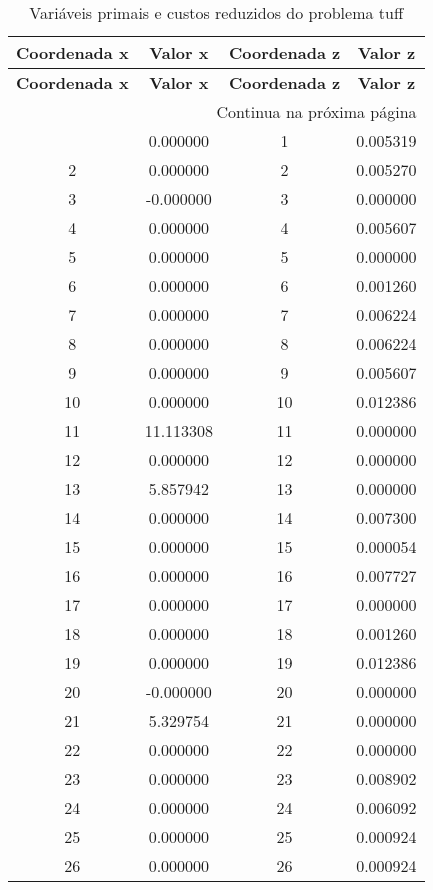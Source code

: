 \documentclass[12pt]{article}
\begin{document}
\begin{longtable}{@{}cccc@{}}
\caption{Variáveis primais e custos reduzidos do problema tuff} \\
\toprule
\textbf{Coordenada x} & \textbf{Valor x} & \textbf{Coordenada z} & \textbf{Valor z} \\
\midrule
\endfirsthead

\toprule
\textbf{Coordenada x} & \textbf{Valor x} & \textbf{Coordenada z} & \textbf{Valor z} \\
\midrule
\endhead

\midrule \multicolumn{4}{r}{{Continua na próxima página}} \\ \midrule
\endfoot

\bottomrule
\endlastfoot
1 & 0.000000 & 1 & 0.005319 \\
2 & 0.000000 & 2 & 0.005270 \\
3 & -0.000000 & 3 & 0.000000 \\
4 & 0.000000 & 4 & 0.005607 \\
5 & 0.000000 & 5 & 0.000000 \\
6 & 0.000000 & 6 & 0.001260 \\
7 & 0.000000 & 7 & 0.006224 \\
8 & 0.000000 & 8 & 0.006224 \\
9 & 0.000000 & 9 & 0.005607 \\
10 & 0.000000 & 10 & 0.012386 \\
11 & 11.113308 & 11 & 0.000000 \\
12 & 0.000000 & 12 & 0.000000 \\
13 & 5.857942 & 13 & 0.000000 \\
14 & 0.000000 & 14 & 0.007300 \\
15 & 0.000000 & 15 & 0.000054 \\
16 & 0.000000 & 16 & 0.007727 \\
17 & 0.000000 & 17 & 0.000000 \\
18 & 0.000000 & 18 & 0.001260 \\
19 & 0.000000 & 19 & 0.012386 \\
20 & -0.000000 & 20 & 0.000000 \\
21 & 5.329754 & 21 & 0.000000 \\
22 & 0.000000 & 22 & 0.000000 \\
23 & 0.000000 & 23 & 0.008902 \\
24 & 0.000000 & 24 & 0.006092 \\
25 & 0.000000 & 25 & 0.000924 \\
26 & 0.000000 & 26 & 0.000924 \\

\end{longtable}
\end{document}
